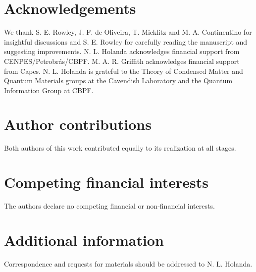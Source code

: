 \documentclass[10pt]{revtex4-1}
\begin{document}



\section*{Acknowledgements}

We thank S. E. Rowley, J. F. de Oliveira, T. Micklitz and M. A. Continentino for insightful discussions and S. E. Rowley for carefully reading the manuscript and suggesting improvements. N. L. Holanda acknowledges financial support from CENPES/Petrobr\'as/CBPF. M. A. R. Griffith acknowledges financial support from Capes. N. L. Holanda is grateful to the Theory of Condensed Matter and Quantum Materials groups at the Cavendish Laboratory and the Quantum Information Group at CBPF.


\section*{Author contributions}

Both authors of this work contributed equally to its realization at all stages.

\section*{Competing financial interests}

The authors declare no competing financial or non-financial interests.

\section*{Additional information}

Correspondence and requests for materials should be addressed to N. L. Holanda. 


\end{document}
